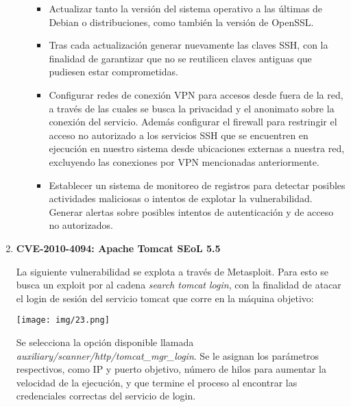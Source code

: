 \documentclass[12pt,oneside,a4paper]{book}
\begin{document}
\begin{enumerate}
\begin{itemize}
\begin{itemize}
\item Actualizar tanto la versión del sistema operativo a las últimas de Debian o distribuciones, como también la versión de OpenSSL.
\item Tras cada actualización generar nuevamente las claves SSH, con la finalidad de garantizar que no se reutilicen claves antiguas que pudiesen estar comprometidas.
 \item  Configurar redes de conexión VPN para accesos desde fuera de la red, a través de las cuales se busca la privacidad y el anonimato sobre la conexión del servicio. Además configurar el firewall para restringir el acceso no autorizado a los servicios SSH que se encuentren en ejecución en nuestro sistema desde ubicaciones externas a nuestra red, excluyendo las conexiones por VPN mencionadas anteriormente.
\item Establecer un sistema de monitoreo de registros para detectar posibles actividades maliciosas o intentos de explotar la vulnerabilidad. Generar alertas sobre posibles intentos de autenticación y de acceso no autorizados.
\end{itemize}
\end{itemize}

\vspace{2em}

\item \textbf{CVE-2010-4094: Apache Tomcat SEoL 5.5}

\vspace{1em}

\hspace{20pt}
La siguiente vulnerabilidad se explota a través de Metasploit. Para esto se busca un exploit por al cadena \textit{search tomcat login}, con la finalidad de atacar el login de sesión del servicio tomcat que corre en la máquina objetivo:

\vspace{1em}

\begin{center}
    \texttt{[image: img/23.png]}
\end{center}

\vspace{1em}

\hspace{20pt}
Se selecciona la opción disponible llamada \textit{auxiliary/scanner/http/tomcat\_mgr\_login}. Se le asignan los parámetros respectivos, como IP y puerto objetivo, número de hilos para aumentar la velocidad de la ejecución, y que termine el proceso al encontrar las credenciales correctas del servicio de login.


\end{enumerate}
\end{document}
